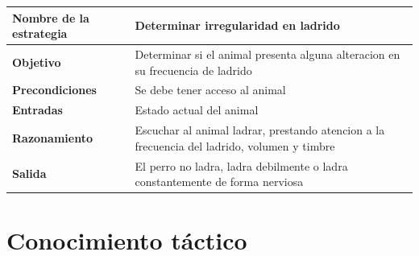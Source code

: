 \documentclass[a4paper,table,xcdraw]{article}
\begin{document}
\begin{longtable}{|m{100pt}|m{300pt}|}
\hline
\textbf{Nombre de la estrategia} & Determinar irregularidad en ladrido                                                         \\ \hline
\endhead
%
\textbf{Objetivo}                & Determinar si el animal presenta alguna alteracion en su frecuencia de ladrido              \\ \hline
\textbf{Precondiciones}          & Se debe tener acceso al animal                                                              \\ \hline
\textbf{Entradas}                & Estado actual del animal                                                                    \\ \hline
\textbf{Razonamiento}            & Escuchar al animal ladrar, prestando atencion a la frecuencia del ladrido, volumen y timbre \\ \hline
\textbf{Salida}                  & El perro no ladra, ladra debilmente o ladra constantemente de forma nerviosa                \\ \hline
\end{longtable}

\section{Conocimiento táctico}
\end{document}
